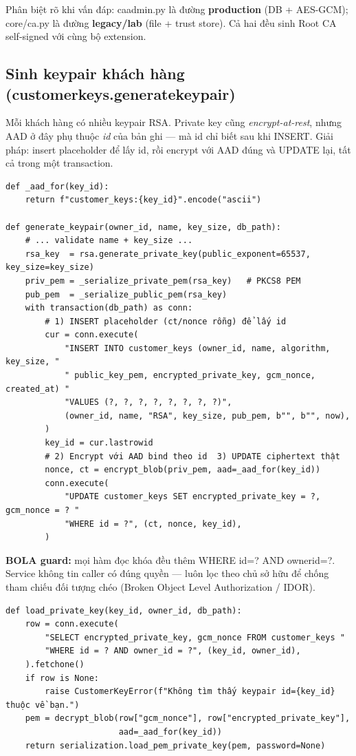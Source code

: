 \documentclass[12pt,a4paper]{article}
\newcommand{\code}[1]{{\ttfamily\small\def\_{\textunderscore\discretionary{}{}{}}#1}}
\begin{document}
\begin{notebox}
Phân biệt rõ khi vấn đáp: \code{ca\_admin.py} là đường \textbf{production} (DB +
AES-GCM); \code{core/ca.py} là đường \textbf{legacy/lab} (file + trust store).
Cả hai đều sinh Root CA self-signed với cùng bộ extension.
\end{notebox}

\subsection{Sinh keypair khách hàng (\code{customer\_keys.generate\_keypair})}

Mỗi khách hàng có nhiều keypair RSA. Private key cũng \emph{encrypt-at-rest},
nhưng AAD ở đây phụ thuộc \emph{id} của bản ghi — mà id chỉ biết sau khi INSERT.
Giải pháp: insert placeholder để lấy id, rồi encrypt với AAD đúng và UPDATE lại,
tất cả trong một transaction.

\begin{Verbatim}
def _aad_for(key_id):
    return f"customer_keys:{key_id}".encode("ascii")

def generate_keypair(owner_id, name, key_size, db_path):
    # ... validate name + key_size ...
    rsa_key  = rsa.generate_private_key(public_exponent=65537, key_size=key_size)
    priv_pem = _serialize_private_pem(rsa_key)   # PKCS8 PEM
    pub_pem  = _serialize_public_pem(rsa_key)
    with transaction(db_path) as conn:
        # 1) INSERT placeholder (ct/nonce rỗng) để lấy id
        cur = conn.execute(
            "INSERT INTO customer_keys (owner_id, name, algorithm, key_size, "
            " public_key_pem, encrypted_private_key, gcm_nonce, created_at) "
            "VALUES (?, ?, ?, ?, ?, ?, ?, ?)",
            (owner_id, name, "RSA", key_size, pub_pem, b"", b"", now),
        )
        key_id = cur.lastrowid
        # 2) Encrypt với AAD bind theo id  3) UPDATE ciphertext thật
        nonce, ct = encrypt_blob(priv_pem, aad=_aad_for(key_id))
        conn.execute(
            "UPDATE customer_keys SET encrypted_private_key = ?, gcm_nonce = ? "
            "WHERE id = ?", (ct, nonce, key_id),
        )
\end{Verbatim}

\textbf{BOLA guard:} mọi hàm đọc khóa đều thêm \code{WHERE id=? AND owner\_id=?}.
Service không tin caller có đúng quyền — luôn lọc theo chủ sở hữu để chống tham
chiếu đối tượng chéo (Broken Object Level Authorization / IDOR).

\begin{Verbatim}
def load_private_key(key_id, owner_id, db_path):
    row = conn.execute(
        "SELECT encrypted_private_key, gcm_nonce FROM customer_keys "
        "WHERE id = ? AND owner_id = ?", (key_id, owner_id),
    ).fetchone()
    if row is None:
        raise CustomerKeyError(f"Không tìm thấy keypair id={key_id} thuộc về bạn.")
    pem = decrypt_blob(row["gcm_nonce"], row["encrypted_private_key"],
                       aad=_aad_for(key_id))
    return serialization.load_pem_private_key(pem, password=None)
\end{Verbatim}
\end{document}
